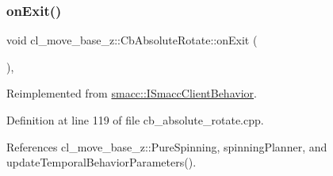 \mbox{\label{classcl__move__base__z_1_1CbAbsoluteRotate_a0e362b8e9f0d7de5aeee183ba4031437}} 
\subsubsection{\texorpdfstring{on\+Exit()}{onExit()}}
{\footnotesize\ttfamily void cl\+\_\+move\+\_\+base\+\_\+z\+::\+Cb\+Absolute\+Rotate\+::on\+Exit (\begin{DoxyParamCaption}{ }\end{DoxyParamCaption})\hspace{0.3cm}{\ttfamily [override]}, {\ttfamily [virtual]}}



Reimplemented from \hyperlink{classsmacc_1_1ISmaccClientBehavior_ad1198fdb2cbdf11f3276d3e23d4c0a50}{smacc\+::\+I\+Smacc\+Client\+Behavior}.



Definition at line 119 of file cb\+\_\+absolute\+\_\+rotate.\+cpp.



References cl\+\_\+move\+\_\+base\+\_\+z\+::\+Pure\+Spinning, spinning\+Planner, and update\+Temporal\+Behavior\+Parameters().


